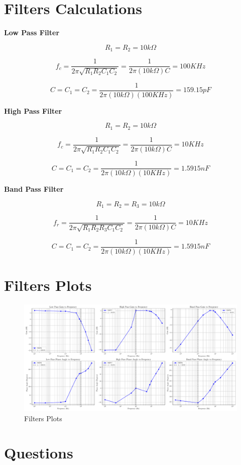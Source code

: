\documentclass[CMPE]{KGCOEReport}
\begin{document}
\section*{Filters Calculations}

\textbf{Low Pass Filter}

\[
    R_1 = R_2 = 10k\Omega
\]

\[
    f_c = \frac{1}{2\pi \sqrt{R_1R_2C_1C_2}} = \frac{1}{2\pi (10k\Omega)C} = 100 KHz
\]

\[
    C = C_1 = C_2 = \frac{1}{2\pi (10k\Omega)(100KHz)} = 159.15 pF
\]

\textbf{High Pass Filter}

\[
    R_1 = R_2 = 10k\Omega
\]

\[
    f_c = \frac{1}{2\pi \sqrt{R_1R_2C_1C_2}} = \frac{1}{2\pi (10k\Omega)C} = 10 KHz
\]

\[
    C = C_1 = C_2 = \frac{1}{2\pi (10k\Omega)(10KHz)} = 1.5915 nF
\]

\textbf{Band Pass Filter}

\[
    R_1 = R_2 = R_3 = 10k\Omega
\]

\[
    f_r = \frac{1}{2\pi \sqrt{R_1R_2R_3C_1C_2}} = \frac{1}{2\pi (10k\Omega)C} = 10 KHz
\]

\[
    C = C_1 = C_2 = \frac{1}{2\pi (10k\Omega)(10KHz)} = 1.5915 nF
\]

\section*{Filters Plots} %

\begin{figure}[H]
    \centering
    \includegraphics[width=1\textwidth]{plots.pdf}
    \caption{Filters Plots}
    \label{fig:part8}
\end{figure}

\section*{Questions}
\end{document}
